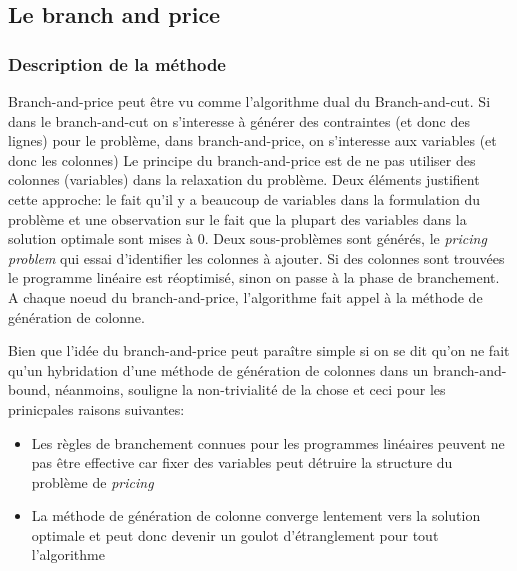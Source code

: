 \documentclass[12pt,a4paper,oneside]{book}
\theoremstyle{definition}
\begin{document}
			
			
			
		\subsection{Le branch and price}
		
			\subsubsection{Description de la méthode}
			Branch-and-price peut être vu comme l'algorithme dual du Branch-and-cut. Si dans le branch-and-cut on s'interesse à générer des contraintes (et donc des lignes) pour le problème, dans branch-and-price, on s'interesse aux variables (et donc les colonnes)
			Le principe du branch-and-price est de ne pas utiliser des colonnes (variables) dans la relaxation du problème. Deux éléments justifient cette approche: le fait qu'il y a beaucoup de variables dans la formulation du problème et une observation sur le fait que la plupart des variables dans la solution optimale sont mises à 0. Deux sous-problèmes sont générés, le \textit{pricing problem} qui essai d'identifier les colonnes à ajouter. Si des colonnes sont trouvées le programme linéaire est réoptimisé, sinon on passe à la phase de branchement. A chaque noeud du branch-and-price, l'algorithme fait appel à la méthode de génération de colonne. 
			
			Bien que l'idée du branch-and-price peut paraître simple si on se dit qu'on ne fait qu'un hybridation d'une méthode de génération de colonnes dans un branch-and-bound, néanmoins, \cite{savelsbergh2001branch} souligne la non-trivialité de la chose et ceci pour les prinicpales raisons suivantes:
			\begin{itemize}
			    \item Les règles de branchement connues pour les programmes linéaires peuvent ne pas être effective car fixer des variables peut détruire la structure du problème de \textit{pricing}
			    \item La méthode de génération de colonne converge lentement vers la solution optimale et peut donc devenir un goulot d'étranglement pour tout l'algorithme
			\end{itemize}
			
\end{document}

